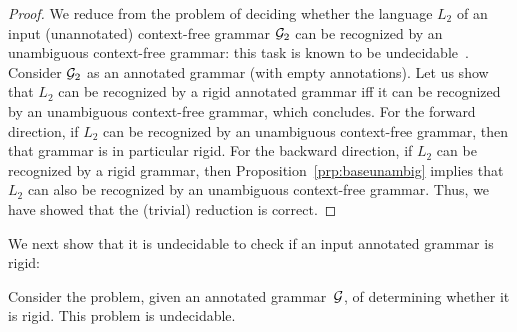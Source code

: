 \begin{proof}
  We reduce from the problem of deciding whether the language $L_2$ of an input
  (unannotated) context-free grammar $\mathcal{G}_2$ can be recognized by an unambiguous
  context-free grammar: this task is known to be
  undecidable~\cite{ginsburg1966ambiguity}. Consider $\mathcal{G}_2$ as an annotated
  grammar (with empty annotations). Let us show that $L_2$ can be recognized by
  a rigid annotated grammar iff it can be recognized by an
  unambiguous context-free grammar, which concludes. For the forward direction,
  if $L_2$ can be recognized
  by an unambiguous context-free grammar, then that grammar is in particular
  rigid. 
  For the backward direction, if $L_2$ can be recognized by a rigid
  grammar, then
  Proposition~\ref{prp:baseunambig} implies that $L_2$ can also be recognized by
  an unambiguous context-free grammar.
  Thus, we have showed that the (trivial) reduction is correct.
\end{proof}

We next show that it is undecidable to check if an input annotated grammar is
rigid:

\begin{proposition}
  \label{prp:unambundecb}
  Consider the problem, given an annotated grammar~$\mathcal{G}$, of determining whether
  it is rigid. This problem is undecidable.
\end{proposition}



